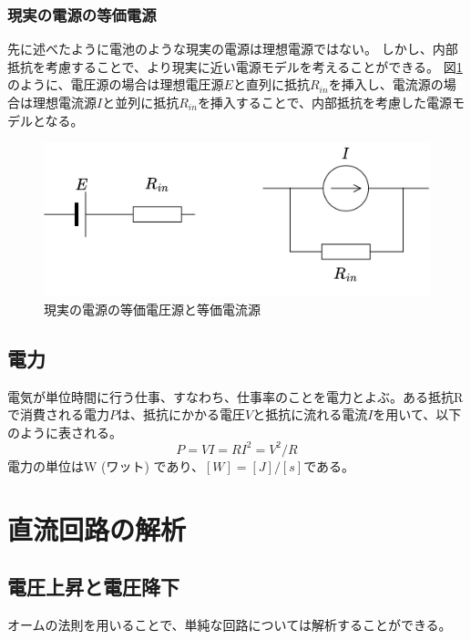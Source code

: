 \documentclass{ltjsreport}
\begin{document}
\subsubsection{現実の電源の等価電源}
先に述べたように電池のような現実の電源は理想電源ではない。
しかし、内部抵抗を考慮することで、より現実に近い電源モデルを考えることができる。
図\ref{fig:real_battery}のように、電圧源の場合は理想電圧源$E$と直列に抵抗$R_{in}$を挿入し、電流源の場合は理想電流源$I$と並列に抵抗$R_{in}$を挿入することで、内部抵抗を考慮した電源モデルとなる。
\begin{figure}[tb]
  \centering
  \includegraphics[keepaspectratio, scale=0.07]
       {img/real_battery.drawio.png}
  \caption{現実の電源の等価電圧源と等価電流源}
  \label{fig:real_battery}
 \end{figure}




\subsection{電力}

電気が単位時間に行う仕事、すなわち、仕事率のことを電力とよぶ。ある抵抗Rで消費される電力$P$は、抵抗にかかる電圧$V$と抵抗に流れる電流$I$を用いて、以下のように表される。
\[
  P = VI = RI^2 = V^2/R
\]
電力の単位はW (ワット) であり、$[W] = [J]/[s]$である。



\section{直流回路の解析}

\subsection{電圧上昇と電圧降下}
オームの法則を用いることで、単純な回路については解析することができる。
\end{document}
